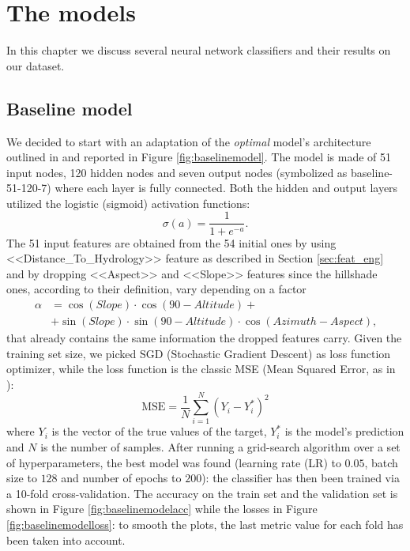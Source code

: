 \chapter{The models}
In this chapter we discuss several neural network classifiers and their results on our dataset.
\section{Baseline model}
\label{sec:baselinemodel}
We decided to start with an adaptation of the \textit{optimal} model's architecture outlined in \cite{blackardDean} and reported in Figure \ref{fig:baselinemodel}. The model is made of 51 input nodes, 120 hidden nodes and seven output nodes (symbolized as baseline-51-120-7) where each layer is fully connected. Both the hidden and output layers utilized the logistic (sigmoid) activation functions:
$$
\sigma(a) = \frac{1}{1 + e^{-a}}\text{.}
$$
The 51 input features are obtained from the 54 initial ones by using <<Distance\_To\_Hydrology>> feature as described in Section \ref{sec:feat_eng} and by dropping <<Aspect>> and <<Slope>> features since the hillshade ones, according to their definition, vary depending on a factor
\begin{equation}
\begin{aligned}
\alpha&=\cos(Slope)\cdot \cos(90-Altitude)+ \\
& +\sin(Slope) \cdot \sin(90-Altitude)\cdot \cos(Azimuth-Aspect)\text{,}
\end{aligned}
\end{equation}
that already contains the same information the dropped features carry. Given the training set size, we picked SGD (Stochastic Gradient Descent) as loss function optimizer, while the loss function is the classic MSE (Mean Squared Error, as in \cite{blackardDean}):
\begin{equation}
\text{MSE} = \frac{1}{N}\sum_{i=1}^{N}(Y_i - Y^{*}_{i})^2
\end{equation}
where $Y_i$ is the vector of the true values of the target, $Y^{*}_{i}$ is the model's prediction and $N$ is the number of samples.
After running a grid-search algorithm over a set of hyperparameters, the best model was found (learning rate (LR) to $0.05$, batch size to $128$ and number of epochs to $200$): the classifier has then been trained via a 10-fold cross-validation. The accuracy on the train set and the validation set is shown in Figure \ref{fig:baselinemodelacc} while the losses in Figure \ref{fig:baselinemodelloss}: to smooth the plots, the last metric value for each fold has been taken into account.
